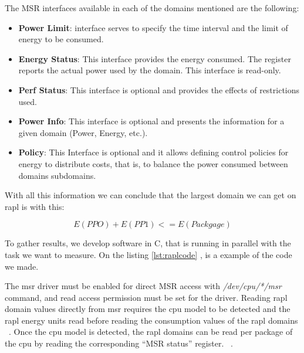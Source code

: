     The MSR interfaces available in each of the domains mentioned are the following:
\begin{itemize}

    \item \textbf{Power Limit}: interface serves to specify the time interval and the limit of energy to be consumed. ~\cite{raplpref2,portela2016}
\item \textbf{Energy Status}: This interface provides the energy consumed. The register reports the actual power used by the domain. This interface is read-only. 
\item\textbf{Perf Status}: This interface is optional and provides the effects of restrictions used.~\cite{intel64and,portela2016}
\item \textbf{Power Info}: This interface is optional and presents the information for a given domain (Power, Energy, etc.).~\cite{portela2016}
\item \textbf{Policy}: This Interface is optional and it allows defining control policies for energy to distribute costs, that is, to balance the power consumed between domains subdomains.  ~\cite{raplpref2}
\end{itemize}

With all this information we can conclude that the largest domain we can get on \gls{rapl} is with this:

\begin{equation}
E(PPO) + E(PP1) <= E(Packgage) 
\end{equation}

To gather results, we develop software in C, that is running in parallel with the task we want to measure. On the listing \ref{lst:raplcode} , is a example of the code we made.

    
    

    The \gls{msr} driver must be enabled for direct MSR access with \textit{/dev/cpu/*/msr} command, and read access permission must be set for the driver. Reading \gls{rapl} domain values directly from \gls{msr} requires the \gls{cpu} model to be detected and the \gls{rapl} energy units read before reading the consumption values of the \gls{rapl} domains ~\cite{raplpref,energypapi}. Once the \gls{cpu} model is detected, the \gls{rapl} domains can be read per package of the \gls{cpu} by reading the corresponding “MSR status” register.  ~\cite{raplpref,intel64and}.
